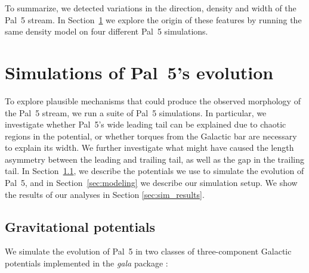 \documentclass[twocolumn]{aastex62}
\newcommand{\package}[1]{\textsl{#1}}
\begin{document}
To summarize, we detected variations in the direction, density and width of the Pal~5 stream.
In Section~\ref{sec:sim} we explore the origin of these features by running the same density model on four different Pal~5 simulations.


\section{Simulations of Pal~5's evolution}
\label{sec:sim}
To explore plausible mechanisms that could produce the observed morphology of the Pal~5 stream, we run a suite of Pal~5 simulations.
In particular, we investigate whether Pal~5's wide leading tail can be explained due to chaotic regions in the potential, or whether torques from the Galactic bar are necessary to explain its width. We further investigate what might have caused the length asymmetry between the leading and trailing tail, as well as the gap in the trailing tail.
In Section~\ref{sec:potential}, we describe the potentials we use to simulate the evolution of Pal~5, and in Section~\ref{sec:modeling} we describe our simulation setup.
We show the results of our analyses in Section \ref{sec:sim_results}.

\subsection{Gravitational potentials}
\label{sec:potential}
We simulate the evolution of Pal~5 in two classes of three-component Galactic potentials implemented in the  \package{gala} package \citep{gala}:
\end{document}

